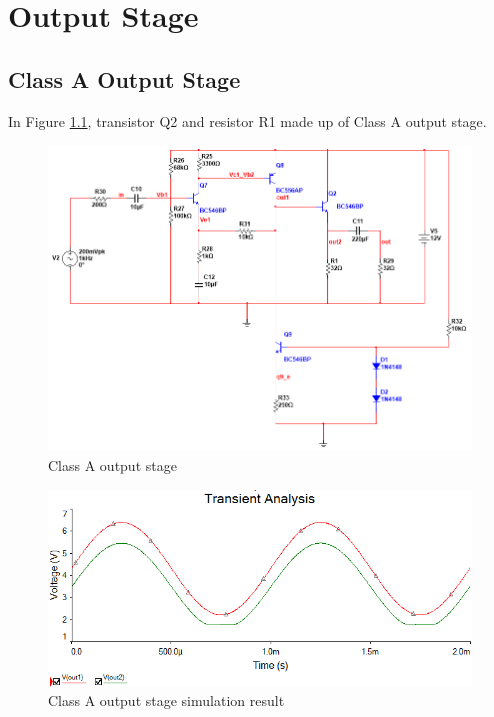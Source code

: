 \chapter{Output Stage}

\section{Class A Output Stage}

In Figure \ref{fig:ClassAoutputstage}, transistor Q2 and resistor R1 made up of Class A output stage.

\begin{figure}[htbp]
\centering
\includegraphics[scale=0.6]{"../Photo/Chap4/Class A output stage"}
\caption{Class A output stage}
\label{fig:ClassAoutputstage}
\end{figure}


\begin{figure}[htbp]
\centering
\includegraphics[scale=0.8]{"../Photo/Chap4/Class A simulation result"}
\caption{Class A output stage simulation result}
\label{fig:ClassAsimulationresult}
\end{figure}

